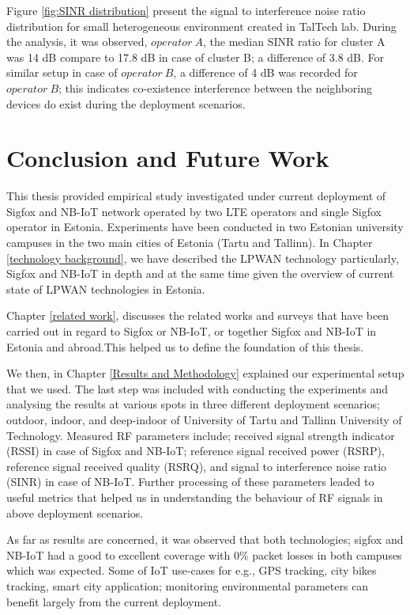 \documentclass[12pt]{article}
\begin{document}
Figure \ref{fig:SINR distribution} present the signal to interference noise ratio distribution for small heterogeneous environment created in TalTech lab. During the analysis, it was observed, $operator\ A$, the median SINR ratio for cluster A was 14 dB compare to 17.8 dB in case of cluster B; a difference of 3.8 dB. For similar setup in case of $operator\ B$, a difference of 4 dB was recorded for $operator\ B$; this indicates co-existence interference between the neighboring devices do exist during the deployment scenarios.



\newpage
\section{Conclusion and Future Work} \label{conclusion}
This thesis provided empirical study investigated under current deployment of Sigfox and NB-IoT network operated by two LTE operators and single Sigfox operator in Estonia. Experiments have been conducted in two Estonian university campuses in the two main cities of Estonia (Tartu and Tallinn). In Chapter \ref{technology background}, we have described the LPWAN technology particularly, Sigfox and NB-IoT in depth and at the same time given the overview of current state of LPWAN technologies in Estonia.\par

Chapter \ref{related work}, discusses the related works and surveys that have been carried out in regard to Sigfox or NB-IoT, or together Sigfox and NB-IoT in Estonia and abroad.This helped us to define the foundation of this thesis.\par

We then, in Chapter \ref{Results and Methodology} explained our experimental setup that we used. The last step was included with conducting the experiments and analysing the results at various spots in three different deployment scenarios; outdoor, indoor, and deep-indoor of University of Tartu and Tallinn University of Technology. Measured RF parameters include; received signal strength indicator (RSSI) in case of Sigfox and NB-IoT; reference signal received power (RSRP), reference signal received quality (RSRQ), and signal to interference noise ratio (SINR) in case of NB-IoT. Further processing  of these parameters leaded to useful metrics that helped us in understanding the behaviour of RF signals in above deployment scenarios.

As far as results are concerned, it was observed that both technologies; sigfox and NB-IoT had a good to excellent coverage with 0\% packet losses in both campuses which was expected. Some of IoT use-cases for e.g., GPS tracking, city bikes tracking, smart city application; monitoring environmental parameters can benefit largely from the current deployment.\par
\end{document}
